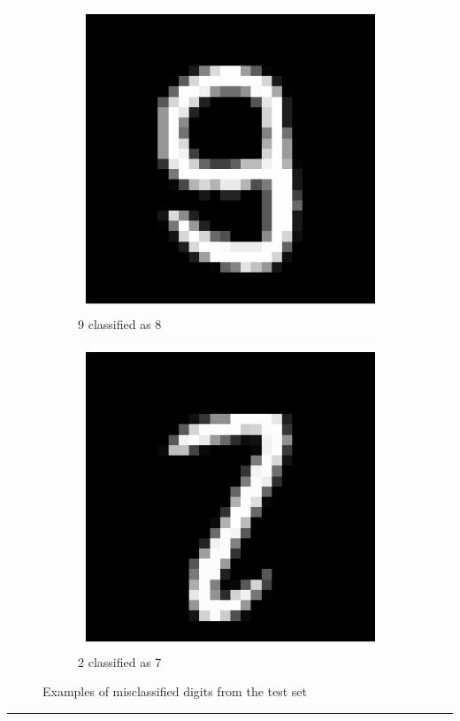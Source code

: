 \documentclass{article}
\begin{document}
\begin{figure}[H]
    \begin{subfigure}[b]{0.3\textwidth}
        \centering
        \includegraphics[width=\textwidth]{digit4.png}
        \caption{9 classified as 8}
        \label{fig:digit4}
    \end{subfigure}
    \hfill
    \begin{subfigure}[b]{0.3\textwidth}
        \centering
        \includegraphics[width=\textwidth]{digit5.png}
        \caption{2 classified as 7}
        \label{fig:digit5}
    \end{subfigure}

    \caption{Examples of misclassified digits from the test set}
    \label{fig:misclassified}
\end{figure}

\noindent\rule{\textwidth}{0.4pt}\\
\end{document}
